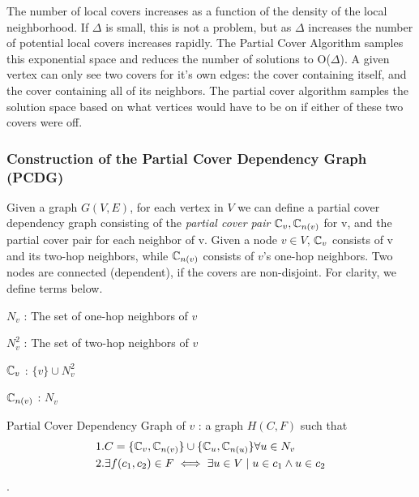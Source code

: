 \documentclass[technote, 10pt, letter]{IEEEtran}
\begin{document}
\label{sec:PCDG}
The number of local covers increases as a function of the density of the local neighborhood. If $\Delta$ is small, this is not a problem, but as $\Delta$ increases the number of potential local covers increases rapidly. The Partial Cover Algorithm samples this exponential space and reduces the number of solutions to O($\Delta$). A given vertex can only see two covers for it's own edges: the cover containing itself, and the cover containing all of its neighbors. The partial cover algorithm samples the solution space based on what vertices would have to be on if either of these two covers were off. 

\subsubsection{Construction of the  Partial Cover Dependency Graph (PCDG)}

Given a graph $G(V,E)$, for each vertex in $V$ we can define a partial cover dependency graph consisting of the {\em partial cover pair} ${\mathbb C}_v, {\mathbb C}_{n(v)}$ for v, and the partial cover pair for each neighbor of v. Given a node $v \in V$, ${\mathbb C}_v$ consists of v and its two-hop neighbors, while ${\mathbb C}_{n(v)}$ consists of $v$'s one-hop neighbors. Two nodes are connected (dependent), if the covers are non-disjoint. For clarity, we define terms below.

\begin{defn}
$N_v$ : The set of one-hop neighbors of $v$
\end{defn}
\begin{defn}
$N_v^2$ : The set of two-hop neighbors of $v$ 
\end{defn}

\begin{defn}
${\mathbb C}_v$ : $\{v\} \cup N_v^2$
\end{defn}

\begin{defn}
${\mathbb C}_{n(v)}$ : $N_v$
\end{defn} 

\begin{defn}
Partial Cover Dependency Graph of $v$ : a graph $H(C,F)$ such that \begin{align*}& 1. C = \{{\mathbb C}_v, {\mathbb C}_{n(v)}\} \cup \{{\mathbb C}_u, {\mathbb C}_{n(u)}\} \forall u \in N_v\\ & 2. \exists f(c_1, c_2) \in F \iff \exists u \in V \mid u \in c_1 \land u \in c_2\end{align*}.
\end{defn} 
\end{document}
